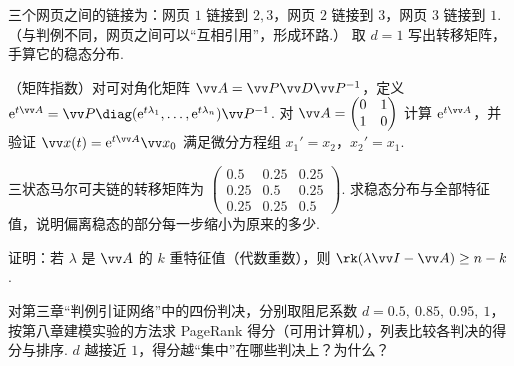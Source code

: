 {\begin{exB}
			\item\label{ex:eig:B13} 三个网页之间的链接为：网页 $1$ 链接到 $2,3$，网页 $2$ 链接到 $3$，网页 $3$ 链接到 $1$.（与判例不同，网页之间可以“互相引用”，形成环路.） 取 $d=1$ 写出转移矩阵，手算它的稳态分布.
			\item\label{ex:eig:B14} （矩阵指数）对可对角化矩阵 $\vv A=\vv P\vv D\vv P^{-1}$，定义 $\mathrm e^{t\vv A}=\vv P\diag(\mathrm e^{t\lambda_1},\ldots,\mathrm e^{t\lambda_n})\vv P^{-1}$. 对 $\vv A=\begin{pmatrix}0&1\\1&0\end{pmatrix}$ 计算 $\mathrm e^{t\vv A}$，并验证 $\vv x(t)=\mathrm e^{t\vv A}\vv x_0$ 满足微分方程组 $x_1'=x_2$，$x_2'=x_1$.
			\item\label{ex:eig:B15} 三状态马尔可夫链的转移矩阵为 $\begin{pmatrix}0.5&0.25&0.25\\0.25&0.5&0.25\\0.25&0.25&0.5\end{pmatrix}$. 求稳态分布与全部特征值，说明偏离稳态的部分每一步缩小为原来的多少.
			\item\label{ex:eig:B16} 证明：若 $\lambda$ 是 $\vv A$ 的 $k$ 重特征值（代数重数），则 $\rk(\lambda\vv I-\vv A)\ge n-k$.
			\item\label{ex:eig:B17} 对第三章“判例引证网络”中的四份判决，分别取阻尼系数 $d=0.5,\ 0.85,\ 0.95,\ 1$，按第八章建模实验的方法求 PageRank 得分（可用计算机），列表比较各判决的得分与排序. $d$ 越接近 $1$，得分越“集中”在哪些判决上？为什么？
		\end{exB}
		
}
